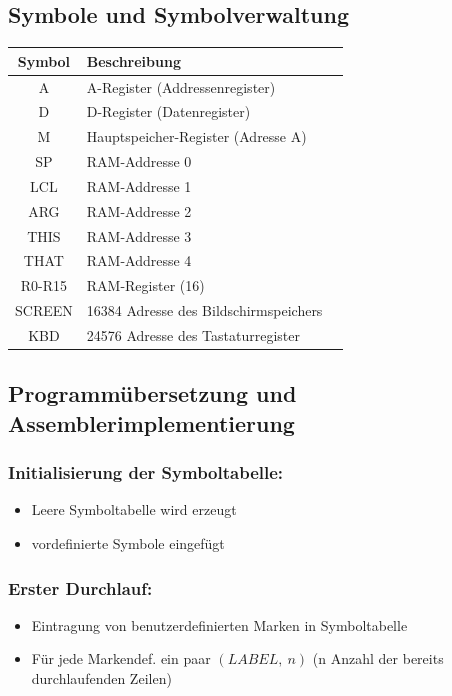 \documentclass[12pt]{report}
\begin{document}
\subsection{Symbole und Symbolverwaltung}

\begin{table}[H]
  \centering
  
  \begin{tabular}{c|ll}
    Symbol & Beschreibung                          & \\\hline
    A      & A-Register (Addressenregister)        & \\
    D      & D-Register (Datenregister)            & \\
    M      & Hauptspeicher-Register (Adresse A)    & \\
    SP     & RAM-Addresse 0                        & \\
    LCL    & RAM-Addresse 1                        & \\
    ARG    & RAM-Addresse 2                        & \\
    THIS   & RAM-Addresse 3                        & \\
    THAT   & RAM-Addresse 4                        & \\
    R0-R15 & RAM-Register (16)                     & \\
    SCREEN & 16384 Adresse des Bildschirmspeichers & \\
    KBD    & 24576 Adresse des Tastaturregister    & \\
  \end{tabular}
\end{table}

\subsection{Programmübersetzung und Assemblerimplementierung}

\subsubsection{Initialisierung der Symboltabelle:}
\begin{itemize}
  \item Leere Symboltabelle wird erzeugt
  \item vordefinierte Symbole eingefügt
\end{itemize}

\subsubsection{Erster Durchlauf:}
\begin{itemize}
  \item Eintragung von benutzerdefinierten Marken in Symboltabelle
  \item Für jede Markendef. ein paar $(LABEL,\ n)$ (n Anzahl der bereits durchlaufenden Zeilen)
\end{itemize}
\end{document}

